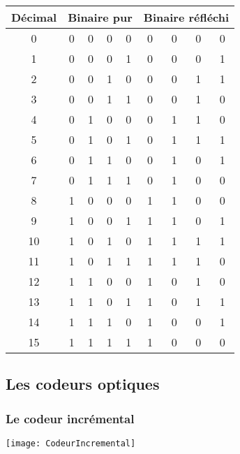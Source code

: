 \begin{center}
\begin{tabular}{|c|cccc|cccc|}
\hline
Décimal & \multicolumn{4}{c|}{Binaire pur} &\multicolumn{4}{c|}{Binaire réfléchi} \\
\hline
\hline
0 & 0 & 0 & 0 & 0 & 0 & 0 & 0 & 0 \\ \hline
1 & 0 & 0 & 0 & 1 & 0 & 0 & 0 & 1 \\ \hline\hline
2 & 0 & 0 & 1 & 0 & 0 & 0 & 1 & 1 \\ \hline
3 & 0 & 0 & 1 & 1 & 0 & 0 & 1 & 0 \\ \hline\hline
4 & 0 & 1 & 0 & 0 & 0 & 1 & 1 & 0 \\ \hline
5 & 0 & 1 & 0 & 1 & 0 & 1 & 1 & 1 \\ \hline
6 & 0 & 1 & 1 & 0 & 0 & 1 & 0 & 1 \\ \hline
7 & 0 & 1 & 1 & 1 & 0 & 1 & 0 & 0 \\ \hline\hline
8 & 1 & 0 & 0 & 0 & 1 & 1 & 0 & 0 \\ \hline
9 & 1 & 0 & 0 & 1 & 1 & 1 & 0 & 1 \\ \hline
10 & 1 & 0 & 1 & 0 & 1 & 1 & 1 & 1 \\ \hline
11 & 1 & 0 & 1 & 1 & 1 & 1 & 1 & 0 \\ \hline
12 & 1 & 1 & 0 & 0 & 1 & 0 & 1 & 0 \\ \hline
13 & 1 & 1 & 0 & 1 & 1 & 0 & 1 & 1 \\ \hline
14 & 1 & 1 & 1 & 0 & 1 & 0 & 0 & 1 \\ \hline
15 & 1 & 1 & 1 & 1 & 1 & 0 & 0 & 0 \\ \hline
\end{tabular}
\end{center}


\subsection{Les codeurs optiques}
\subsubsection{Le codeur incrémental}

\begin{marginfigure}
\texttt{[image: CodeurIncremental]}
\end{marginfigure}

